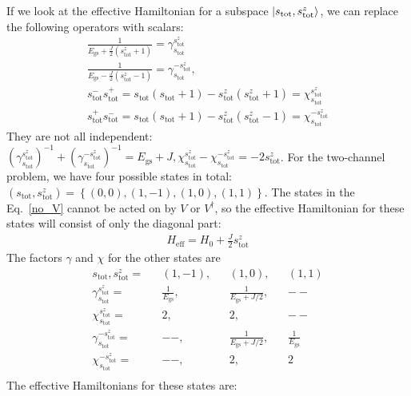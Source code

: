 \documentclass[12pt]{revtex4-2}
\begin{document}
If we look at the effective Hamiltonian for a subspace \(\ket{s_\text{tot}, s^z_\text{tot}}\), we can replace the following operators with scalars:
\begin{gather}
	\frac{1}{E_\text{gs} + \frac{J}{2} \left(s_\text{tot}^z + 1\right)} = \gamma_{s_\text{tot}}^{s_\text{tot}^z}\\
	\frac{1}{E_\text{gs} - \frac{J}{2} \left(s_\text{tot}^z - 1\right)} = \gamma_{s_\text{tot}}^{-s_\text{tot}^z},\\
	s_\text{tot}^- s_\text{tot}^+ = s_\text{tot}\left(s_\text{tot} + 1\right) - s^z_\text{tot}\left(s^z_\text{tot} + 1\right) = \chi_{s_\text{tot}}^{s_\text{tot}^z}\\
	s_\text{tot}^+ s_\text{tot}^- = s_\text{tot}\left(s_\text{tot} + 1\right) - s^z_\text{tot}\left(s^z_\text{tot} - 1\right) = \chi_{s_\text{tot}}^{-s_\text{tot}^z}
\end{gather}
They are not all independent: \(\left(\gamma_{s_\text{tot}}^{s_\text{tot}^z}\right)^{-1} + \left(\gamma_{s_\text{tot}}^{-s_\text{tot}^z}\right)^{-1} =  E_\text{gs} + J, \chi_{s_\text{tot}}^{s_\text{tot}^z} - \chi_{s_\text{tot}}^{-s_\text{tot}^z} = -2 s^z_\text{tot}\). 
For the two-channel problem, we have four possible states in total: \(\left( s_\text{tot}, s_\text{tot}^z \right) = \left\{ (0,0), (1,-1), (1,0), (1,1) \right\} \). The states in the Eq.~\ref{no_V} cannot be acted on by \(V\) or \(V^\dagger\), so the effective Hamiltonian for these states will consist of only the diagonal part:
\begin{align}
	H_\text{eff} = H_0 + \frac{J}{2}s^z_\text{tot}
\end{align}
The factors \(\gamma\) and \(\chi\) for the other states are
\begin{align}
	s_\text{tot}, s_\text{tot}^z = && (1,-1), && (1,0), && (1,1)\\
	\gamma_{s_\text{tot}}^{s_\text{tot}^z} = && \frac{1}{E_\text{gs}}, && \frac{1}{E_\text{gs} + J/2}, && -- \\
	\chi_{s_\text{tot}}^{s_\text{tot}^z} = && 2, && 2, && --\\
	\gamma_{s_\text{tot}}^{-s_\text{tot}^z} = && --, && \frac{1}{E_\text{gs} + J/2}, && \frac{1}{E_\text{gs}}\\
	\chi_{s_\text{tot}}^{-s_\text{tot}^z} = && --, && 2, && 2\\
\end{align}
The effective Hamiltonians for these states are:
\end{document}
